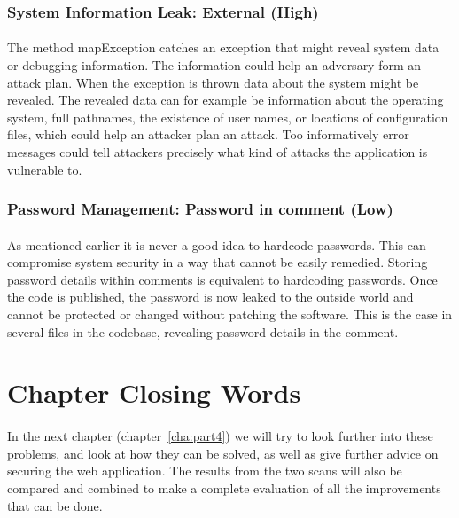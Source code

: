\documentclass[11pt,english,a4paper]{report}
\begin{document}
\subsubsection{System Information Leak: External (High)}
\paragraph{}
The method mapException catches an exception that might reveal system data or debugging information. 
The information could help an adversary form an attack plan.
When the exception is thrown data about the system  might be revealed. 
The revealed data can for example be information about the operating system, full pathnames, the existence of user names, or locations of configuration files, which could help an attacker plan an attack.
Too informatively error messages could tell attackers precisely what kind of attacks the application is vulnerable to.

\subsubsection{Password Management: Password in comment (Low)}
\paragraph{}
As mentioned earlier it is never a good idea to hardcode passwords. 
This can compromise system security in a way that cannot be easily remedied.
Storing password details within comments is equivalent to hardcoding passwords.
Once the code is published, the password is now leaked to the outside world and cannot be protected or changed without patching the software. 
This is the case in several files in the codebase, revealing password details in the comment.


\section{Chapter Closing Words}
\paragraph{}
In the next chapter (chapter~\ref{cha:part4}) we will try to look further into these problems, and look at how they can be solved, as well as give further advice on securing the web application.
The results from the two scans will also be compared and combined to make a complete evaluation of all the improvements that can be done.
\end{document}
